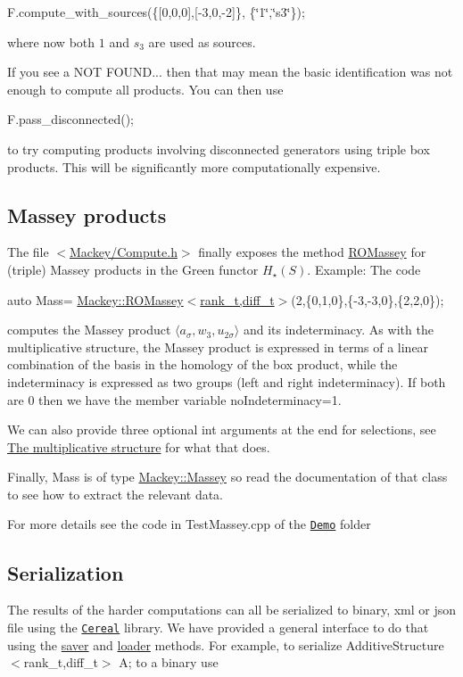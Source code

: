 {\ttfamily F.\+compute\+\_\+with\+\_\+sources(\{\mbox{[}0,0,0\mbox{]},\mbox{[}-\/3,0,-\/2\mbox{]}\}, \{\char`\"{}1\char`\"{},\char`\"{}s3\char`\"{}\});}

where now both $1$ and $s_3$ are used as sources.

If you see a {\ttfamily N\+OT F\+O\+U\+ND...} then that may mean the basic identification was not enough to compute all products. You can then use

{\ttfamily F.\+pass\+\_\+disconnected();}

to try computing products involving disconnected generators using triple box products. This will be significantly more computationally expensive.\hypertarget{use_step1Mass}{}\subsection{Massey products}\label{use_step1Mass}
The file {\ttfamily $<$\hyperlink{Compute_8h}{Mackey/\+Compute.\+h}$>$} finally exposes the method \hyperlink{namespaceMackey_ab75d7bcfa2d92d01bea0d5eef9f48398}{R\+O\+Massey} for (triple) Massey products in the Green functor $H_{\star}(S)$. Example\+: The code

{\ttfamily auto Mass= \hyperlink{namespaceMackey_ab75d7bcfa2d92d01bea0d5eef9f48398}{Mackey\+::\+R\+O\+Massey$<$rank\+\_\+t,diff\+\_\+t$>$}(2,\{0,1,0\},\{-\/3,-\/3,0\},\{2,2,0\});}

computes the Massey product $\langle a_{\sigma},w_3,u_{2\sigma}\rangle $ and its indeterminacy. As with the multiplicative structure, the Massey product is expressed in terms of a linear combination of the basis in the homology of the box product, while the indeterminacy is expressed as two groups (left and right indeterminacy). If both are $0$ then we have the member variable {\ttfamily no\+Indeterminacy=1}.

We can also provide three optional {\ttfamily int} arguments at the end for selections, see \hyperlink{use_step1mult}{The multiplicative structure} for what that does.

Finally, {\ttfamily Mass} is of type {\ttfamily \hyperlink{classMackey_1_1Massey}{Mackey\+::\+Massey}} so read the documentation of that class to see how to extract the relevant data.

For more details see the code in Test\+Massey.\+cpp of the \href{https://github.com/NickG-Math/Mackey/tree/master/Demo}{\tt Demo} folder\hypertarget{use_step1Cer}{}\subsection{Serialization}\label{use_step1Cer}
The results of the harder computations can all be serialized to binary, xml or json file using the \href{https://uscilab.github.io/cereal}{\tt Cereal} library. We have provided a general interface to do that using the \hyperlink{namespaceMackey_a1824d780ce15f1845e4f87bf056feec9}{saver} and \hyperlink{namespaceMackey_a735958355cdca12e0d312b7e604f28bc}{loader} methods. For example, to serialize {\ttfamily Additive\+Structure$<$rank\+\_\+t,diff\+\_\+t$>$ A;} to a binary use

